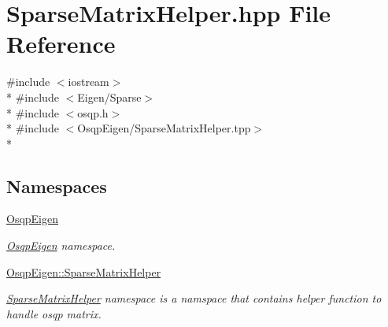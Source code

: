 \section{Sparse\+Matrix\+Helper.\+hpp File Reference}
\label{SparseMatrixHelper_8hpp}
{\ttfamily \#include $<$iostream$>$}\\*
{\ttfamily \#include $<$Eigen/\+Sparse$>$}\\*
{\ttfamily \#include $<$osqp.\+h$>$}\\*
{\ttfamily \#include $<$Osqp\+Eigen/\+Sparse\+Matrix\+Helper.\+tpp$>$}\\*
\subsection*{Namespaces}
\begin{DoxyCompactItemize}
\item 
 \hyperlink{namespaceOsqpEigen}{Osqp\+Eigen}
\begin{DoxyCompactList}\small\item\em \hyperlink{namespaceOsqpEigen}{Osqp\+Eigen} namespace. \end{DoxyCompactList}\item 
 \hyperlink{namespaceOsqpEigen_1_1SparseMatrixHelper}{Osqp\+Eigen\+::\+Sparse\+Matrix\+Helper}
\begin{DoxyCompactList}\small\item\em \hyperlink{namespaceOsqpEigen_1_1SparseMatrixHelper}{Sparse\+Matrix\+Helper} namespace is a namspace that contains helper function to handle osqp matrix. \end{DoxyCompactList}\end{DoxyCompactItemize}
